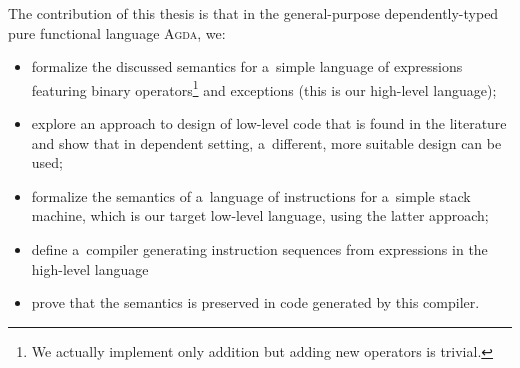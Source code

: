 \noindent The contribution of this thesis is that in the general-purpose dependently-typed
pure functional language \textsc{Agda}, we:
\begin{itemize}
	\item formalize the discussed semantics for a~simple language of expressions
		featuring binary operators\footnote{We actually implement only addition but adding new
		operators is trivial.} and exceptions (this is our high-level language);
	\item explore an approach to design of low-level code that is found in the literature
		and show that in dependent setting, a~different, more suitable design can be used;
	\item formalize the semantics of a~language of instructions for a~simple stack machine,
		which is our target low-level language, using the latter approach;
	\item define a~compiler generating instruction sequences from expressions in the high-level
		language
	\item prove that the semantics is preserved in code generated by this compiler.
\end{itemize}
